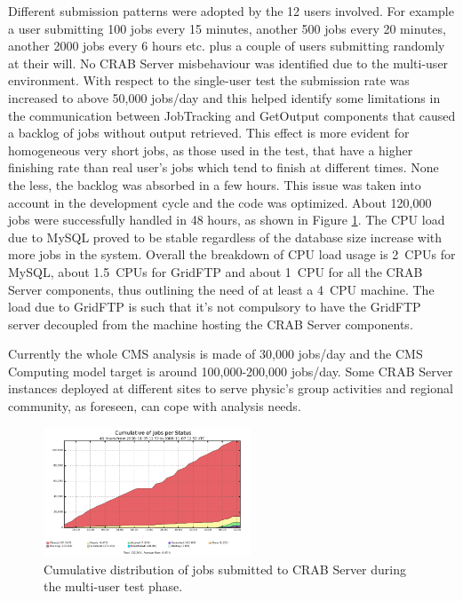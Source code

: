 \begin{itemize}
Different submission patterns were adopted by the 12 users
involved. For example a user submitting 100 jobs every 15 minutes,
another 500 jobs every 20 minutes, another 2000 jobs every 6 hours
etc. plus a couple of users submitting randomly at their will.  No
CRAB Server misbehaviour was identified due to the multi-user
environment. With respect to the single-user test the submission rate
was increased to above 50,000 jobs/day and this helped identify some
limitations in the communication between JobTracking and GetOutput
components that caused a backlog of jobs without output
retrieved. This effect is more evident for homogeneous very short
jobs, as those used in the test, that have a higher finishing rate
than real user's jobs which tend to finish at different times. None
the less, the backlog was absorbed in a few hours. This issue was
taken into account in the development cycle and the code was
optimized.  About 120,000 jobs were successfully handled in 48 hours,
as shown in Figure \ref{fig:stressmulti}.  The CPU load due to MySQL
proved to be stable regardless of the database size increase with more
jobs in the system. Overall the breakdown of CPU load usage is 2~CPUs
for MySQL, about 1.5~CPUs for GridFTP and about 1~CPU for all the CRAB
Server components, thus outlining the need of at least a 4~CPU
machine.  The load due to GridFTP is such that it's not compulsory to
have the GridFTP server decoupled from the machine hosting the CRAB
Server components.

Currently the whole CMS analysis is made of 30,000 jobs/day and the
CMS Computing model target is around 100,000-200,000 jobs/day. Some
CRAB Server instances deployed at different sites to serve physic's
group activities and regional community, as foreseen, can cope with
analysis needs.
\end{itemize}
\begin{figure}
\centering
\includegraphics[width=0.55\textwidth]{figures/MultiUserJobStatus.png}
\caption{Cumulative distribution of jobs submitted to CRAB Server
  during the multi-user test phase. }
\label{fig:stressmulti}
\end{figure}



